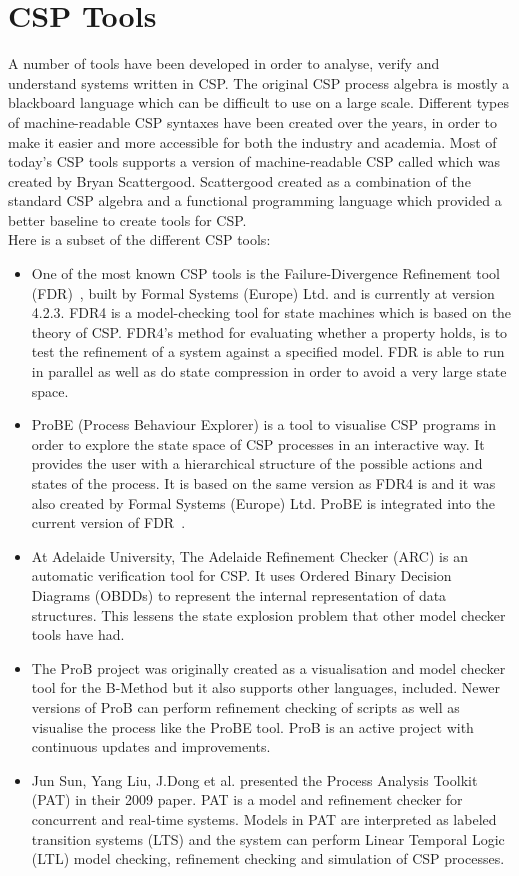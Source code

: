 \section{CSP Tools}
A number of tools have been developed in order to analyse, verify and understand systems written in CSP. The original CSP process algebra is mostly a blackboard language which can be difficult to use on a large scale. Different types of machine-readable CSP syntaxes have been created over the years, in order to make it easier and more accessible for both the industry and academia. Most of today's CSP tools supports a version of machine-readable CSP called \cspm{} which was created by Bryan Scattergood\cite{Scattergood1998}. Scattergood created \cspm{} as a combination of the standard CSP algebra and a functional programming language which provided a better baseline to create tools for CSP.\\
Here is a subset of the different CSP tools:
\begin{itemize}
\item One of the most known CSP tools is the Failure-Divergence Refinement tool (FDR)~\cite{fdr}, built by Formal Systems (Europe) Ltd. and is currently at version 4.2.3. FDR4 is a model-checking tool for state machines which is based on the theory of CSP. FDR4's method for evaluating whether a property holds, is to test the refinement of a system against a specified model.
FDR is able to run in parallel as well as do state compression in order to avoid a very large state space.
\item ProBE (Process Behaviour Explorer)\cite{probe} is a tool to visualise CSP programs in order to explore the state space of CSP processes in an interactive way. It provides the user with a hierarchical structure of the possible actions and states of the process. It is based on the same \cspm{} version as FDR4 is and it was also created by Formal Systems (Europe) Ltd. ProBE is integrated into the current version of FDR~\cite{fdr}.
\item At Adelaide University, The Adelaide Refinement Checker (ARC)\cite{Parashkevov1996} is an automatic verification tool for CSP. It uses Ordered Binary Decision Diagrams (OBDDs) to represent the internal representation of data structures. This lessens the state explosion problem that other model checker tools have had.
\item The ProB project\cite{ProB}\cite{Leuschel2003} was originally created as a visualisation and model checker tool for the B-Method\cite{abrial2005b} but it also supports other languages, \cspm{} included. Newer versions of ProB can perform refinement checking of \cspm{} scripts as well as visualise the process like the ProBE tool. ProB is an active project with continuous updates and improvements.
\item Jun Sun, Yang Liu, J.Dong et al. presented the Process Analysis Toolkit (PAT) in their 2009 paper\cite{Sun2009}. PAT is a model and refinement checker for concurrent and real-time systems. Models in PAT are interpreted as labeled transition systems (LTS) and the system can perform Linear Temporal Logic (LTL) model checking, refinement checking and simulation of CSP processes.
\end{itemize}

